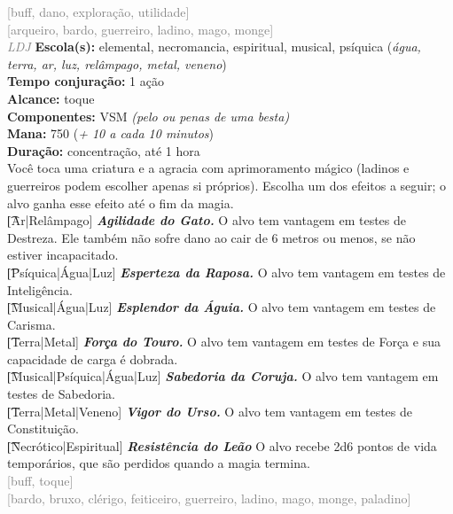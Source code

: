 \documentclass{RPG_Adventure}[2021/10/20]
\begin{document}
{\scriptsize \textcolor{gray}{[buff, dano, exploração, utilidade]\\}}
{\scriptsize \textcolor{gray}{[arqueiro, bardo, guerreiro, ladino, mago, monge]\\}}
{\tiny \textcolor{gray}{\textit{LDJ}}}\jump{}
{\small \t \textbf{Escola(s):} elemental, necromancia, espiritual, musical, psíquica (\textit{água, terra, ar, luz, relâmpago, metal, veneno})\\\t \textbf{Tempo conjuração:} 1 ação\\\t \textbf{Alcance:} toque\\\t \textbf{Componentes:} VSM \textit{(pelo ou penas de uma besta)}\\\t \textbf{Mana:} 750 (\textit{+ 10 a cada 10 minutos})\\\t \textbf{Duração:} concentração, até 1 hora\\}
{\normalsize Você toca uma criatura e a agracia com aprimoramento mágico (ladinos e guerreiros podem escolher apenas si próprios). Escolha um dos efeitos a seguir; o alvo ganha esse efeito até o fim da magia.\\\t [Ar|Relâmpago] \textbf{\textit{Agilidade do Gato.}} O alvo tem vantagem em testes de Destreza. Ele também não sofre dano ao cair de 6 metros ou menos, se não estiver incapacitado.\\\t [Psíquica|Água|Luz] \textbf{\textit{Esperteza da Raposa.}} O alvo tem vantagem em testes de Inteligência.\\\t [Musical|Água|Luz] \textbf{\textit{Esplendor da Águia.}} O alvo tem vantagem em testes de Carisma.\\\t [Terra|Metal] \textbf{\textit{Força do Touro.}} O alvo tem vantagem em testes de Força e sua capacidade de carga é dobrada.  \\\t [Musical|Psíquica|Água|Luz] \textbf{\textit{Sabedoria da Coruja.}} O alvo tem vantagem em testes de Sabedoria.\\\t [Terra|Metal|Veneno] \textbf{\textit{Vigor do Urso.}} O alvo tem vantagem em testes de Constituição.\\\t [Necrótico|Espiritual] \textbf{\textit{Resistência do Leão}} O alvo recebe 2d6 pontos de vida temporários, que são perdidos quando a magia termina.\\}
{\scriptsize \textcolor{gray}{[buff, toque]\\}}
{\scriptsize \textcolor{gray}{[bardo, bruxo, clérigo, feiticeiro, guerreiro, ladino, mago, monge, paladino]\\}}
\end{document}
